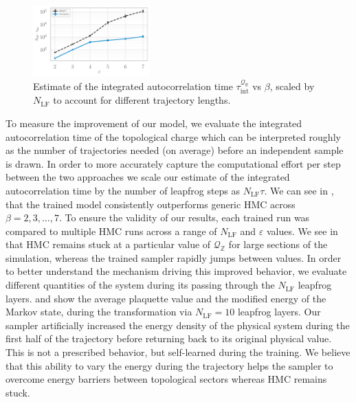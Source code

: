 \documentclass{article} %
\begin{document}
\begin{figure}
   \centering
      \centering
      \includegraphics[width=0.4\textwidth]{figures/autocorr_vs_beta_blue_2120.pdf}
      \caption{\label{fig:autocorr_vs_beta}Estimate of the integrated autocorrelation time
      \(\tau_{\mathrm{int}}^{\mathcal{Q}_{\mathbb{R}}}\) vs \(\beta\), scaled by \(N_{\mathrm{LF}}\) to account for
   different trajectory lengths.}
\end{figure}
To measure the improvement of our model, we evaluate the integrated autocorrelation time of the topological charge which can be interpreted roughly as the number of trajectories needed (on average) before an independent sample is drawn.
%
In order to more accurately capture the computational effort per step between the two approaches we scale our estimate of the integrated autocorrelation time by the number of leapfrog steps as \(N_{\mathrm{LF}}\tau\).
We can see in , that the trained model consistently outperforms generic HMC across \(\beta = 2, 3, \ldots, 7\).
%
To ensure the validity of our results, each trained run was compared to multiple HMC runs across a range of \(N_{\mathrm{LF}}\) and \(\varepsilon\) values.
%
We see in  that HMC remains stuck at a particular value of \(\mathcal{Q}_{\mathbb{Z}}\) for large sections of the simulation, whereas the trained sampler rapidly jumps between values.
%
In order to better understand the mechanism driving this improved behavior, we evaluate different quantities
of the system during its passing through
the $N_{\mathrm{LF}}$ leapfrog layers.%
%
 and  show the average plaquette value and the modified energy of the
Markov state, during the transformation via $N_{\mathrm{LF}}=10$ leapfrog layers.
Our sampler artificially increased the energy density of the physical system during the first half of the trajectory before returning back to its original physical value.
This is not a prescribed behavior, but self-learned during the training.
%
We believe that this ability to vary the energy during the trajectory helps the sampler to overcome energy barriers between topological sectors whereas HMC remains stuck.
%
%
\end{document}
